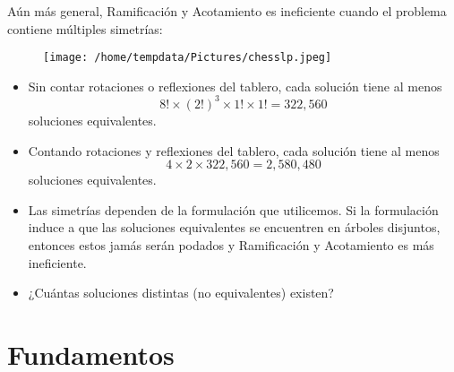 \documentclass[aspectratio=169,professionalfonts]{beamer}
\begin{document}
\begin{frame}
	Aún más general, Ramificación y Acotamiento es ineficiente cuando el
	problema contiene múltiples simetrías:
	\begin{figure}
		\texttt{[image: /home/tempdata/Pictures/chesslp.jpeg]}
	\end{figure}
\end{frame}

\begin{frame}
	\begin{itemize}
		\item Sin contar rotaciones o reflexiones del tablero, cada solución
			tiene al menos
		\begin{equation*}
			8! \times (2!)^3 \times 1! \times 1! = 322{,}560
		\end{equation*}
		soluciones equivalentes.
		\item Contando rotaciones y reflexiones del tablero, cada solución
			tiene al menos
		\begin{equation*}
			4 \times 2 \times 322{,}560 = 2{,}580{,}480
		\end{equation*}
		soluciones equivalentes.
		\item Las simetrías dependen de la formulación que utilicemos. Si la
			formulación induce a que las soluciones equivalentes se encuentren
			en árboles disjuntos, entonces estos jamás serán podados y
			Ramificación y Acotamiento es más ineficiente.
		\item ¿Cuántas soluciones distintas (no equivalentes) existen?
	\end{itemize}
\end{frame}



\section{Fundamentos}
\end{document}

